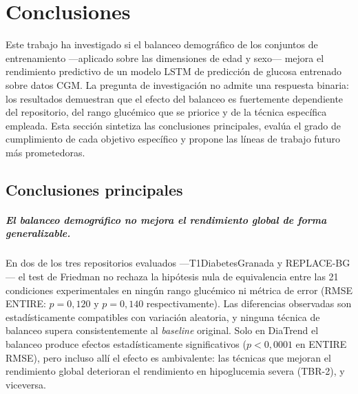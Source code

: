 \chapter{Conclusiones}
\label{chapter:conclusiones}

Este trabajo ha investigado si el balanceo demográfico de los conjuntos
de entrenamiento ---aplicado sobre las dimensiones de edad y sexo---
mejora el rendimiento predictivo de un modelo LSTM de predicción de
glucosa entrenado sobre datos CGM. La pregunta de investigación no admite
una respuesta binaria: los resultados demuestran que el efecto del
balanceo es fuertemente dependiente del repositorio, del rango glucémico
que se priorice y de la técnica específica empleada. Esta sección sintetiza
las conclusiones principales, evalúa el grado de cumplimiento de cada
objetivo específico y propone las líneas de trabajo futuro más prometedoras.

\section{Conclusiones principales}
\label{sec:conclusiones_principales}

\paragraph{El balanceo demográfico no mejora el rendimiento global de
forma generalizable.}
En dos de los tres repositorios evaluados ---T1DiabetesGranada y
REPLACE-BG--- el test de Friedman no rechaza la hipótesis nula de
equivalencia entre las 21 condiciones experimentales en ningún rango
glucémico ni métrica de error (RMSE ENTIRE: $p = 0{,}120$ y $p = 0{,}140$
respectivamente). Las diferencias observadas son estadísticamente
compatibles con variación aleatoria, y ninguna técnica de balanceo
supera consistentemente al \textit{baseline} original. Solo en DiaTrend
el balanceo produce efectos estadísticamente significativos ($p < 0{,}0001$
en ENTIRE RMSE), pero incluso allí el efecto es ambivalente: las técnicas
que mejoran el rendimiento global deterioran el rendimiento en hipoglucemia
severa (TBR-2), y viceversa.

